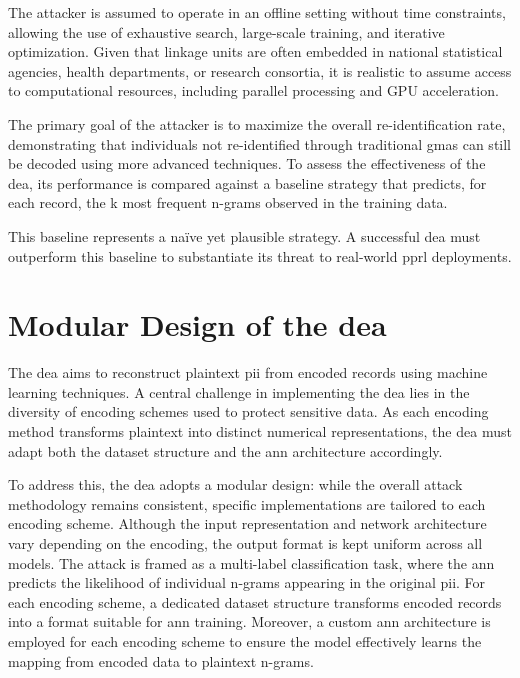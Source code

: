 The attacker is assumed to operate in an offline setting without time constraints, allowing the use of exhaustive search, large-scale training, and iterative optimization.
Given that linkage units are often embedded in national statistical agencies, health departments, or research consortia, it is realistic to assume access to computational resources, including parallel processing and GPU acceleration.

The primary goal of the attacker is to maximize the overall re-identification rate, demonstrating that individuals not re-identified through traditional \ac{gma}s can still be decoded using more advanced techniques.
To assess the effectiveness of the \ac{dea}, its performance is compared against a baseline strategy that predicts, for each record, the k most frequent n-grams observed in the training data.

This baseline represents a naïve yet plausible strategy.
A successful \ac{dea} must outperform this baseline to substantiate its threat to real-world \ac{pprl} deployments.

\section{Modular Design of the \ac{dea}} \label{sec:designandimplementation}

The \ac{dea} aims to reconstruct plaintext \ac{pii} from encoded records using machine learning techniques.
A central challenge in implementing the \ac{dea} lies in the diversity of encoding schemes used to protect sensitive data.
As each encoding method transforms plaintext into distinct numerical representations, the \ac{dea} must adapt both the dataset structure and the \ac{ann} architecture accordingly.

To address this, the \ac{dea} adopts a modular design: while the overall attack methodology remains consistent, specific implementations are tailored to each encoding scheme.
Although the input representation and network architecture vary depending on the encoding, the output format is kept uniform across all models.
The attack is framed as a multi-label classification task, where the \ac{ann} predicts the likelihood of individual n-grams appearing in the original \ac{pii}.
For each encoding scheme, a dedicated dataset structure transforms encoded records into a format suitable for \ac{ann} training.
Moreover, a custom \ac{ann} architecture is employed for each encoding scheme to ensure the model effectively learns the mapping from encoded data to plaintext n-grams.

